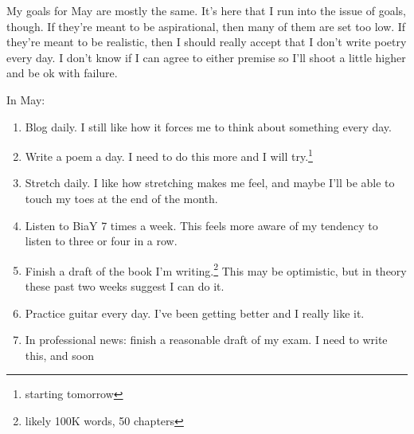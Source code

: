 \documentclass[12pt]{article}[titlepage]
\renewcommand{\,}{\textsuperscript{,}}
\begin{document}
My goals for May are mostly the same.
It's here that I run into the issue of goals, though.
If they're meant to be aspirational, then many of them are set too low.
If they're meant to be realistic, then I should really accept that I don't write poetry every day.
I don't know if I can agree to either premise so I'll shoot a little higher and be ok with failure.

In May:
\begin{enumerate}
\item Blog daily. I still like how it forces me to think about something every day.
\item Write a poem a day. I need to do this more and I will try.\footnote{starting tomorrow}
\item Stretch daily. I like how stretching makes me feel, and maybe I'll be able to touch my toes at the end of the month.
\item Listen to BiaY 7 times a week. This feels more aware of my tendency to listen to three or four in a row.
\item Finish a draft of the book I'm writing.\footnote{likely 100K words, 50 chapters} This may be optimistic, but in theory these past two weeks suggest I can do it.
\item Practice guitar every day. I've been getting better and I really like it.
\item In professional news: finish a reasonable draft of my exam. I need to write this, and soon
\end{enumerate}
\end{document}
